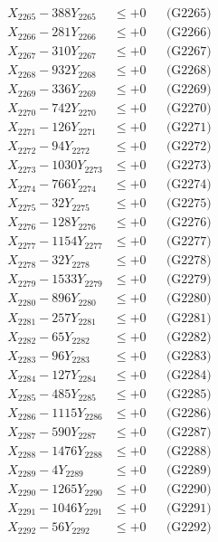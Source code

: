 \documentclass[a4paper,10pt]{article}
\begin{document}
{\begin{align}
X_{2265} - 388Y_{2265} &\leq +0 && \text{(G2265)} \\
X_{2266} - 281Y_{2266} &\leq +0 && \text{(G2266)} \\
X_{2267} - 310Y_{2267} &\leq +0 && \text{(G2267)} \\
X_{2268} - 932Y_{2268} &\leq +0 && \text{(G2268)} \\
X_{2269} - 336Y_{2269} &\leq +0 && \text{(G2269)} \\
X_{2270} - 742Y_{2270} &\leq +0 && \text{(G2270)} \\
\allowbreak
X_{2271} - 126Y_{2271} &\leq +0 && \text{(G2271)} \\
X_{2272} - 94Y_{2272} &\leq +0 && \text{(G2272)} \\
X_{2273} - 1030Y_{2273} &\leq +0 && \text{(G2273)} \\
X_{2274} - 766Y_{2274} &\leq +0 && \text{(G2274)} \\
X_{2275} - 32Y_{2275} &\leq +0 && \text{(G2275)} \\
X_{2276} - 128Y_{2276} &\leq +0 && \text{(G2276)} \\
X_{2277} - 1154Y_{2277} &\leq +0 && \text{(G2277)} \\
X_{2278} - 32Y_{2278} &\leq +0 && \text{(G2278)} \\
X_{2279} - 1533Y_{2279} &\leq +0 && \text{(G2279)} \\
X_{2280} - 896Y_{2280} &\leq +0 && \text{(G2280)} \\
\allowbreak
X_{2281} - 257Y_{2281} &\leq +0 && \text{(G2281)} \\
X_{2282} - 65Y_{2282} &\leq +0 && \text{(G2282)} \\
X_{2283} - 96Y_{2283} &\leq +0 && \text{(G2283)} \\
X_{2284} - 127Y_{2284} &\leq +0 && \text{(G2284)} \\
X_{2285} - 485Y_{2285} &\leq +0 && \text{(G2285)} \\
X_{2286} - 1115Y_{2286} &\leq +0 && \text{(G2286)} \\
X_{2287} - 590Y_{2287} &\leq +0 && \text{(G2287)} \\
X_{2288} - 1476Y_{2288} &\leq +0 && \text{(G2288)} \\
X_{2289} - 4Y_{2289} &\leq +0 && \text{(G2289)} \\
X_{2290} - 1265Y_{2290} &\leq +0 && \text{(G2290)} \\
\allowbreak
X_{2291} - 1046Y_{2291} &\leq +0 && \text{(G2291)} \\
X_{2292} - 56Y_{2292} &\leq +0 && \text{(G2292)} \\

\end{align}}
\end{document}
